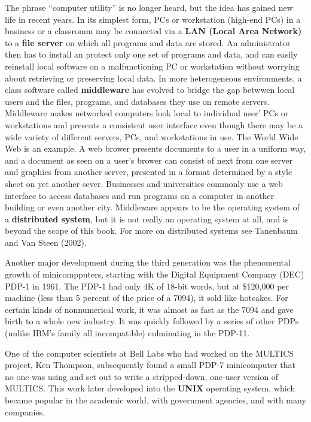 \documentclass{book}
\newcommand {\kw}  [1] {\textbf{#1}}
\begin{document}
The phrase ``computer utility'' is no longer heard, but the idea has gained new life in recent years.
In its simplest form, PCs or workstation (high-end PCs) in a business or a classromm 
may be connected via a \kw{LAN (Local Area Network)} to a \kw{file server} on which all programs and data are stored.
An administrator then has to install an protect only one set of programs and data, 
and can easily reinstall local software on a malfunctioning PC or workstation without worrying about retrieving or preserving local data.
In more heterogeneous environments, a class software called \kw{middleware} has evolved 
to bridge the gap betwwen local users and the files, programs, and databases they use on remote servers.
Middleware makes networked computers look local to individual user' PCs or workstations 
and presents a consistent user interface even though there may be a wide variety of different servers, PCs, and workstations in use.
The World Wide Web is an example.
A web brower presents documents to a user in a uniform way, and a document as seen on a user's brower can consist of next from one server 
and graphics from another server, presented in a format determined by a style sheet on yet another sever.
Businesses and universities commonly use a web interface to access databases and run programs on a computer in another building or even another city.
Middleware appears to be the operating system of a \kw{distributed system}, 
but it is not really an operating system at all, and is beyond the scope of this book.
For more on distributed systems see Tanenbaum and Van Steen (2002).

Another major development during the third generation was the phenomental growth of minicompputers, 
starting with the Digital Equipment Company (DEC) PDP-1 in 1961.
The PDP-1 had only 4K of 18-bit words, but at \$120,000 per machine (less than 5 percent of the price of a 7094), it sold like hotcakes.
For certain kinds of nonnumerical work, it was almost as fast as the 7094 and gave birth to a whole new industry.
It was quickly followed by a series of other PDPs (unlike IBM's family all incompatible) culminating in the PDP-11.

One of the computer scientists at Bell Labs who had worked on the MULTICS project, Ken Thompson, 
subsequently found a small PDP-7 minicomputer that no one was using and set out to write a stripped-down, one-user version of MULTICS.
This work later developed into the \kw{UNIX} operating system, which became popular in the academic world, 
with government agencies, and with many companies.
\end{document}
